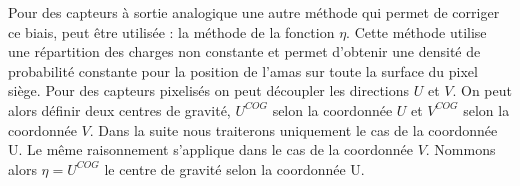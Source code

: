    \medskip
   
   Pour des capteurs \`a sortie analogique une autre m\'ethode qui permet de corriger ce biais, peut \^etre utilis\'ee : la m\'ethode de la fonction $\eta$. Cette m\'ethode utilise une r\'epartition des charges non constante et permet d'obtenir une densit\'e de probabilit\'e constante pour la position de l'amas sur toute la surface du pixel si\`ege. Pour des capteurs pixelis\'es on peut d\'ecoupler les directions $U$ et $V$. On peut alors d\'efinir deux centres de gravit\'e, $U^{COG}$ selon la coordonn\'ee $U$ et $V^{COG}$ selon la coordonn\'ee $V$. Dans la suite nous traiterons uniquement le cas de la coordonn\'ee U. Le m\^eme raisonnement s'applique dans le cas de la coordonn\'ee $V$. Nommons alors $\eta = U^{COG}$ le centre de gravit\'e selon la coordonn\'ee U.
   
   
%    
%    

